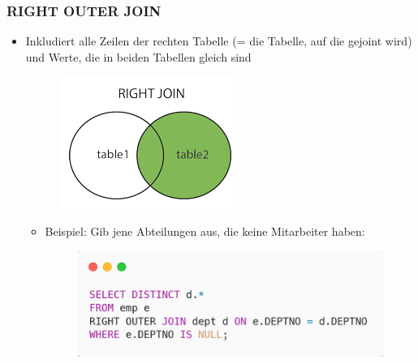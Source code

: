 \subsubsection{RIGHT OUTER JOIN}
\begin{itemize}
    \item Inkludiert alle Zeilen der rechten Tabelle (= die Tabelle, auf die gejoint wird) und Werte, die in beiden Tabellen gleich sind
    \begin{figure}[H]
        \centering
        \includegraphics{res/themekorb_2/joins_right_outer_join.png} 
    \end{figure}
    \begin{itemize}
        \item Beispiel: Gib jene Abteilungen aus, die keine Mitarbeiter haben:
        \begin{figure}[H]
            \centering 
            \includegraphics[scale=.45]{res/themekorb_2/joins_right_outer_join_example.png}
        \end{figure}
    \end{itemize}
\end{itemize}


